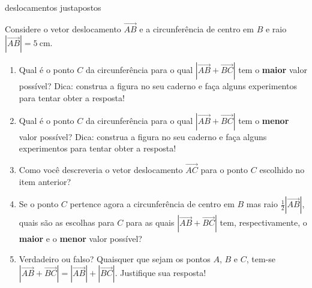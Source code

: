 \begin{task}{ deslocamentos justapostos}
\label{ativ-corrida-de-vetores-02}



Considere o vetor deslocamento \(\overrightarrow{AB}\) e a circunferência de centro em \(B\) e raio \(|\overrightarrow{AB}| = 5~\text{cm}\).
\begin{center}\end{center}\begin{enumerate}
\item {} 
Qual é o ponto \(C\) da circunferência para o qual \(|\overrightarrow{AB} + \overrightarrow{BC}|\) tem o \textbf{maior} valor possível? Dica: construa a figura no seu caderno e faça alguns experimentos para tentar obter a resposta!

\item {} 
Qual é o ponto \(C\) da circunferência para o qual \(|\overrightarrow{AB} + \overrightarrow{BC}|\) tem o \textbf{menor} valor possível? Dica: construa a figura no seu caderno e faça alguns experimentos para tentar obter a resposta!

\item {} 
Como você descreveria o vetor deslocamento \(\overrightarrow{AC}\) para o ponto \(C\) escolhido no item anterior?

\item {} 
Se o ponto \(C\) pertence agora a circunferência de centro em \(B\) mas raio \(\frac{1}{2} |\overrightarrow{AB}|\), quais são as escolhas para \(C\) para as quais \(|\overrightarrow{AB} + \overrightarrow{BC}|\) tem, respectivamente, o \textbf{maior} e o \textbf{menor} valor possível?

\item {} 
Verdadeiro ou falso? Quaisquer que sejam os pontos \(A\), \(B\) e \(C\), tem-se \(|\overrightarrow{AB} + \overrightarrow{BC}| = |\overrightarrow{AB}| + |\overrightarrow{BC}|\). Justifique sua resposta!

\end{enumerate}
\end{task}


